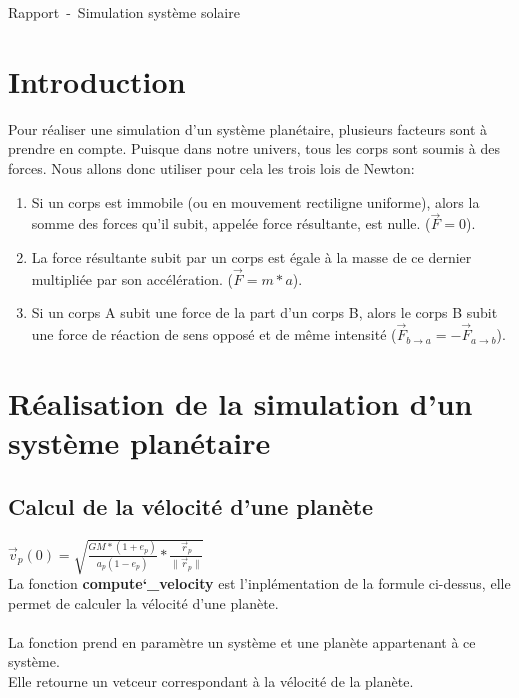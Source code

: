 \documentclass[a4paper,10pt]{article}
\title{\doctitle}
\author{\docauthor}
\date{\docdate}
\newcommand{\doctitle}{Rapport}
\newcommand{\docsubtitle}{Simulation système solaire}
\begin{document}
    \begin{center}
    {\huge \doctitle~-~\docsubtitle}\newline
    \end{center}

    \tableofcontents

    \newpage

    \section{Introduction}\label{sec:introduction}

    Pour réaliser une simulation d'un système planétaire, plusieurs facteurs sont à prendre en compte.
    Puisque dans notre univers, tous les corps sont soumis à des forces.
    Nous allons donc utiliser pour cela les trois lois de Newton:

    \begin{enumerate}
        \item Si un corps est immobile (ou en mouvement rectiligne uniforme), alors la somme des forces qu’il subit, appelée force résultante, est nulle. ($\vec{F} = 0$).
        \item La force résultante subit par un corps est égale à la masse de ce dernier multipliée par son accélération. ($\vec{F} = m * a$).
        \item Si un corps A subit une force de la part d’un corps B, alors le corps B subit une force de réaction de sens opposé et de même intensité ($\vec{F}_{b\to{a}} = -\vec{F}_{a\to{b}}$).
    \end{enumerate}
    
    \section{Réalisation de la simulation d'un système planétaire}\label{sec:réalisation-de-la-simulation-d'un-système-planétaire}

    \subsection{Calcul de la vélocité d'une planète}\label{subsec:calcul-de-la-vélocité-d'une-planète}

    $\vec{v}_{p}(0) = \sqrt{\frac{GM * (1 + e_{p})}{a_{p}(1 - e_{p})} * \frac{\vec{r}_{p}}{\|\vec{r}_{p}\|}}$\\

    La fonction \textbf{compute\char`_velocity} est l'inplémentation de la formule ci-dessus, elle permet de calculer la vélocité d'une planète. \\\\
    La fonction prend en paramètre un système et une planète appartenant à ce système.\\
    Elle retourne un vetceur correspondant à la vélocité de la planète.
\end{document}
